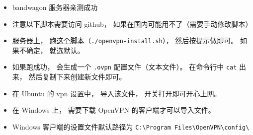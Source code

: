 
\begin{issues}
\issueDraft
\end{issues}

\begin{itemize}
\item bandwagon 服务器亲测成功
\item 注意以下脚本需要访问 github， 如果在国内可能用不了（需要手动修改脚本）
\item 服务器上， 跑\href{https://github.com/MacroUniverse/openvpn-install/blob/master/openvpn-install.sh}{这个脚本}（\verb|./openvpn-install.sh|）， 然后按提示做即可。 如果不确定， 就选默认。
\item 如果跑成功， 会生成一个 \verb|.ovpn| 配置文件（文本文件）。 在命令行中 \verb|cat| 出来， 然后复制下来创建新文件即可。
\item 在 Ubuntu 的 vpn 设置中， 导入该文件， 开关打开即可开心上网。
\item 在 Windows 上， 需要下载 OpenVPN 的客户端才可以导入文件。
\item Windows 客户端的设置文件默认路径为 \verb|C:\Program Files\OpenVPN\config\|
\end{itemize}
